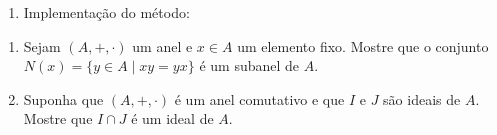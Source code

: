 \documentclass{beamer}
\begin{document}
    \begin{frame}
        \begin{enumerate}[label={\arabic*})]
            \conti
            \item Implementação do método:
                \begin{center}
                \end{center}
        \end{enumerate}
    \end{frame}

    \begin{frame}
        \begin{enumerate}[label={\arabic*})]
            \item Sejam $(A, +, \cdot)$ um anel e $x \in A$ um elemento fixo. Mostre que o conjunto $N(x) = \{y \in A \mid xy = yx \}$ é um subanel de $A$.

            \vspace{2cm}

            \item Suponha que $(A, +, \cdot)$ é um anel comutativo e que $I$ e $J$ são ideais de $A$. Mostre que $I \cap J$ é um ideal de $A$.
        \end{enumerate}
    \end{frame}
\end{document}
